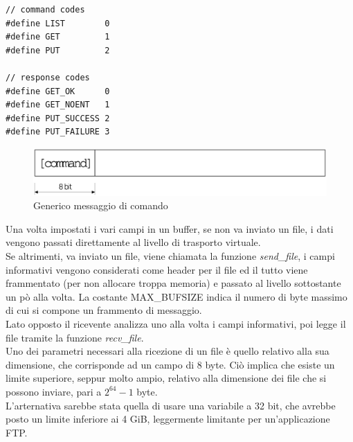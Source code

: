 \begin{lstlisting}[title=basic.h]
// command codes
#define LIST 		0
#define GET 		1
#define PUT 		2

// response codes
#define GET_OK      0
#define GET_NOENT   1
#define PUT_SUCCESS 2
#define PUT_FAILURE 3
\end{lstlisting}
\begin{figure}[!h]
\includegraphics[scale=0.35]{images/gen_message}
\caption{Generico messaggio di comando}
\end{figure}
Una volta impostati i vari campi in un buffer, se non va inviato un file, i dati
vengono passati direttamente al livello di trasporto virtuale.\\
Se altrimenti, va inviato un file, viene chiamata la funzione \emph{send\_file}, 
i campi informativi vengono considerati come header per il file ed il tutto viene 
frammentato (per non allocare troppa memoria) e passato al livello sottostante
un pò alla volta. La costante MAX\_BUFSIZE indica il numero di byte massimo di
cui si compone un frammento di messaggio.\\
Lato opposto il ricevente analizza uno alla volta i campi informativi, poi 
legge il file tramite la funzione \emph{recv\_file}.\\
Uno dei parametri necessari alla ricezione di un file è quello relativo alla sua
dimensione, che corrisponde ad un campo di 8 byte. Ciò implica che esiste un 
limite superiore, seppur molto ampio, relativo alla dimensione dei file che si 
possono inviare, pari a $2^{64} - 1$ byte.\\
L'arternativa sarebbe stata quella di usare una variabile a 32 bit, che avrebbe
posto un limite inferiore ai 4 GiB, leggermente limitante per un'applicazione FTP.
